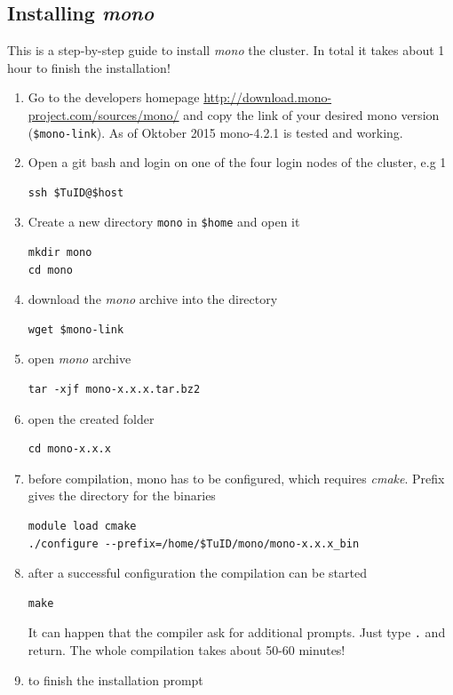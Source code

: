 \documentclass[11pt,twoside,a4paper]{fdyartcl}
\begin{document}
\subsection{Installing \emph{mono}}
\label{sec:mono}
This is a step-by-step guide to install \emph{mono} the cluster. In total it takes about 1 hour to finish the installation!
\begin{enumerate}
\item Go to the developers homepage \url{http://download.mono-project.com/sources/mono/} and copy the link of your desired mono version (\verb|$mono-link|). As of Oktober 2015 mono-4.2.1 is tested and working.
\item Open a git bash and login on one of the four login nodes of the cluster, e.g 1
\begin{verbatim}
ssh $TuID@$host
\end{verbatim}
\item Create a new directory \verb|mono| in \verb|$home| and open it
\begin{verbatim}
mkdir mono
cd mono
\end{verbatim}
\item download the \emph{mono} archive into the directory
\begin{verbatim}
wget $mono-link
\end{verbatim}
\item open \emph{mono} archive
\begin{verbatim}
tar -xjf mono-x.x.x.tar.bz2
\end{verbatim}
\item open the created folder
\begin{verbatim}
cd mono-x.x.x
\end{verbatim}
\item before compilation, mono has to be configured, which requires \emph{cmake}. Prefix gives the directory for the binaries
\begin{verbatim}
module load cmake
./configure --prefix=/home/$TuID/mono/mono-x.x.x_bin
\end{verbatim} 
\item after a successful configuration the compilation can be started
\begin{verbatim}
make
\end{verbatim}
It can happen that the compiler ask for additional prompts. Just type \verb|.| and return.
The whole compilation takes about 50-60 minutes!
\item to finish the installation prompt
\begin{verbatim}

\end{verbatim}
\end{enumerate}
\end{document}
